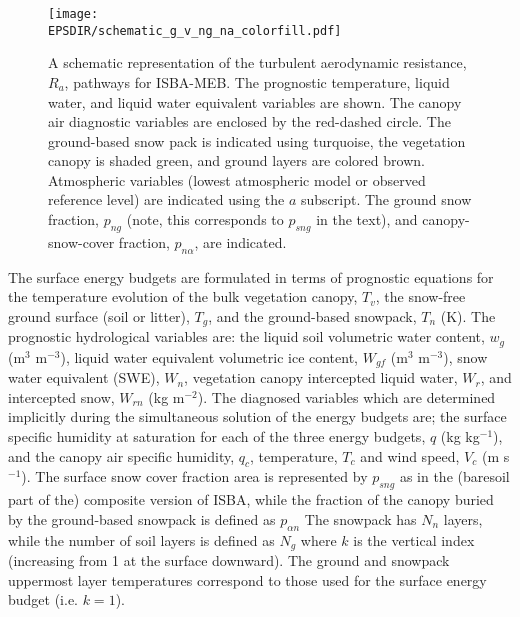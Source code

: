 \begin{figure}[!b]
\centerline{ 
\texttt{[image: \\EPSDIR/schematic\_g\_v\_ng\_na\_colorfill.pdf]}}
\caption{
A schematic representation of 
the turbulent aerodynamic resistance, $R_{a}$, pathways for
ISBA-MEB. The prognostic temperature, liquid water, and liquid water
equivalent variables are shown.
The canopy air diagnostic variables are enclosed by the red-dashed circle.
The ground-based snow pack is indicated using
turquoise, the vegetation canopy is shaded green,
and ground layers are colored brown.
Atmospheric variables (lowest atmospheric 
model or observed reference level) are indicated using
the $a$ subscript.
The ground snow fraction, $p_{ng}$ (note, this corresponds to
$p_{sng}$ in the text), and canopy-snow-cover 
fraction, $p_{n\alpha}$, are indicated.
}
\label{fig:schematic_meb}
\end{figure}


The surface energy budgets are formulated in terms of prognostic
equations for the temperature evolution of the bulk vegetation canopy, $T_v$, 
the snow-free ground surface (soil or litter), $T_g$, and the
ground-based
snowpack, $T_n$ (K). The prognostic hydrological variables
are: the liquid soil volumetric water content, $w_g$ (m$^3$ m$^{-3}$),
liquid water equivalent volumetric
ice content, $W_{gf}$ (m$^3$ m$^{-3}$), snow water equivalent
(SWE), $W_n$,
vegetation canopy intercepted liquid water, $W_r$, and intercepted
snow, $W_{rn}$ (kg m$^{-2}$).  
%
The diagnosed variables which are determined implicitly during the
simultaneous solution of the energy budgets are; 
the surface specific humidity at saturation 
for each of the three energy budgets, $q$ (kg
kg$^{-1}$), and the canopy air specific humidity, $q_c$, temperature,
$T_c$ and wind speed, $V_c$ (m s$^{-1}$).
%
The surface snow cover fraction
area is represented by $p_{sng}$ as in the (baresoil part of the) 
composite version of ISBA, 
while the fraction of the canopy
buried by the ground-based snowpack is defined as $p_{\alpha n}$
%
The snowpack has $N_n$ layers, while the number of soil
layers is defined as $N_g$ where $k$ is the vertical index (increasing
from 1 at the surface downward). The ground and snowpack uppermost
layer temperatures 
correspond to those used for the surface energy budget (i.e. $k=1$).
%

